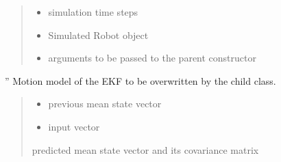 \documentclass[letterpaper,10pt,english]{sphinxmanual}
\begin{document}
\begin{fulllineitems}
\begin{fulllineitems}
\begin{quote}
\begin{description}
\begin{itemize}
\item {} 
\sphinxAtStartPar
{} \textendash{} simulation time steps

\item {} 
\sphinxAtStartPar
{} \textendash{} Simulated Robot object

\item {} 
\sphinxAtStartPar
{} \textendash{} arguments to be passed to the parent constructor

\end{itemize}

\end{description}\end{quote}

\end{fulllineitems}


\begin{fulllineitems}
\label{\detokenize{GFLocalization:EKF_4DOFAUV_CtVelocityMM_DVLDepthYawOM.EKF_4DOFAUV_CtVelocityMM_DVLDepthYawOM.f}}
\pysigstartsignatures
{}
\pysigstopsignatures
\sphinxAtStartPar
”
Motion model of the EKF to be overwritten by the child class.
\begin{quote}\begin{description}
\begin{itemize}
\item {} 
\sphinxAtStartPar
{} \textendash{} previous mean state vector

\item {} 
\sphinxAtStartPar
{} \textendash{} input vector

\end{itemize}

\sphinxAtStartPar
predicted mean state vector and its covariance matrix

\end{description}\end{quote}


\end{fulllineitems}
\end{fulllineitems}
\end{document}
